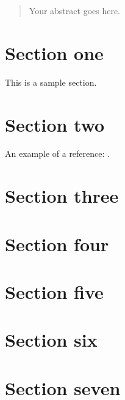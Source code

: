 \documentclass[11pt]{article} %
\theoremstyle{plain}
\theoremstyle{definition}
\begin{document}






\begin{abstract}
  Your abstract goes here.
\end{abstract}

\section{Section one}

This is a sample section.

\section{Section two}

An example of a reference:
\cite{hastie/etal:2009}.

\section{Section three}
\section{Section four}
\section{Section five}
\section{Section six}
\section{Section seven}



\end{document}
